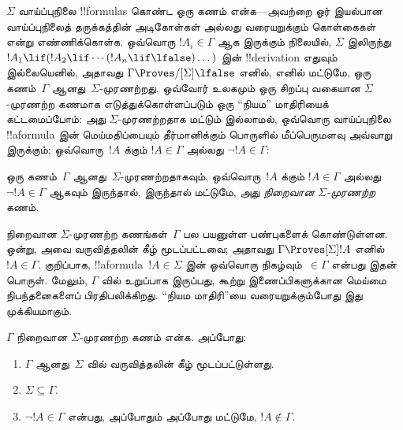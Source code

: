 \documentclass[../../../include/open-logic-section]{subfiles}
\begin{document}


$\Sigma$ வாய்ப்புநிலை !!{formula}s கொண்ட ஒரு கணம் என்க---அவற்றை ஓர்
இயல்பான வாய்ப்புநிலைத் தருக்கத்தின் அடிகோள்கள் அல்லது வரையறுக்கும்
கொள்கைகள் என்று எண்ணிக்கொள்க. ஒவ்வொரு $!A_i \in \Gamma$ ஆக இருக்கும்
நிலையில், $\Sigma$ இலிருந்து $!A_1 \lif (!A_2 \lif \cdots
(!A_n \lif \lfalse)\dots)$ இன் !!{derivation} எதுவும் இல்லையெனில்,
அதாவது $\Gamma \Proves/[\Sigma] \lfalse$ எனில், எனில் மட்டுமே,
ஒரு கணம்~$\Gamma$ ஆனது~$\Sigma$-முரணற்றது. ஒவ்வோர் உலகமும் ஒரு சிறப்பு
வகையான $\Sigma$-முரணற்ற கணமாக எடுத்துக்கொள்ளப்படும் ஒரு “நியம” மாதிரியைக்
கட்டமைப்போம்: அது $\Sigma$-முரணற்றதாக மட்டும் இல்லாமல், ஒவ்வொரு
வாய்ப்புநிலை !!a{formula} இன் மெய்மதிப்பையும் தீர்மானிக்கும் பொருளில்
மீப்பெருமளவு அவ்வாறு இருக்கும்; ஒவ்வொரு~$!A$ க்கும் $!A \in \Gamma$
அல்லது $\lnot !A \in \Gamma$:

\begin{defn}
  ஒரு கணம்~$\Gamma$ ஆனது~$\Sigma$-முரணற்றதாகவும், ஒவ்வொரு~$!A$ க்கும்
  $!A \in \Gamma$ அல்லது $\lnot !A \in \Gamma$ ஆகவும் இருந்தால்,
  இருந்தால் மட்டுமே, அது \emph{நிறைவான $\Sigma$-முரணற்ற} கணம்.
\end{defn}

நிறைவான $\Sigma$-முரணற்ற கணங்கள்~$\Gamma$ பல பயனுள்ள பண்புகளைக்
கொண்டுள்ளன. ஒன்று, அவை வருவித்தலின் கீழ் மூடப்பட்டவை; அதாவது $\Gamma
\Proves[\Sigma] !A$ எனில் $!A \in \Gamma$. குறிப்பாக,
!!a{formula}~$!A \in \Sigma$ இன் ஒவ்வொரு நிகழ்வும்~$\in
\Gamma$ என்பது இதன் பொருள். மேலும், $\Gamma$ வில் உறுப்பாக இருப்பது,
கூற்று இணைப்பிகளுக்கான மெய்மை நிபந்தனைகளைப் பிரதிபலிக்கிறது. “நியம
மாதிரி”யை வரையறுக்கும்போது இது முக்கியமாகும்.

\begin{prop}
  $\Gamma$ நிறைவான $\Sigma$-முரணற்ற கணம் என்க. அப்போது:
  \begin{enumerate}
  \item {}%
    $\Gamma$ ஆனது~$\Sigma$ வில் வருவித்தலின் கீழ் மூடப்பட்டுள்ளது.
  \item {}%
    $\Sigma \subseteq \Gamma$.
  \item {}%
    $\lnot!A \in \Gamma$ என்பது, அப்போதும் அப்போது மட்டுமே,
    $!A \notin \Gamma$.
  \end{enumerate}
\end{prop}
\end{document}
